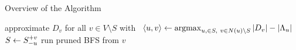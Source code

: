 \begin{algorithm}[tb]
\caption{Overview of the \localswaps Algorithm}
\label{algo:local-swaps}
\begin{algorithmic}[1]
\Repeat
\State approximate $D_v$ for all $v \in V \setminus S$ with~\cite{DBLP:journals/jcss/Cohen97}
\State$\left< u, v \right> \gets \argmax_{u, \in S,\ v\in N(u) \setminus S} |D_v| - |\Lambda_u|$
\label{line:ghc-ls-good-swap}
\State$S \gets S_{-u}^{+v}$
\State run pruned BFS from $v$
\label{line:ghc-ls-pruned-bfs}
\end{algorithmic}
\end{algorithm}

